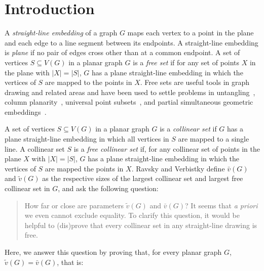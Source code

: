 

\section{Introduction}


A \emph{straight-line embedding} of a graph $G$ maps each vertex to a point in the plane and each edge to a line segment between its endpoints. A straight-line
embedding is \emph{plane} if no pair of edges cross other than at a
common endpoint. A set
of vertices  $S\subseteq V(G)$ in a planar graph $G$ is a \emph{free
  set} if for any set of points $X$ in the plane with $|X|=|S|$, $G$ has a plane
straight-line embedding in which the vertices of $S$ are mapped to the points in $X$.  Free sets are useful tools in graph drawing
and related areas and have been used to settle problems in untangling~\cite{bose.dujmovic.ea:polynomial,dalozzo.dujmovic.ea:drawing,dujmovic:utility,ravsky.verbitsky:on,ravsky.verbitsky:on-arxiv}, column planarity~\cite{dalozzo.dujmovic.ea:drawing,dujmovic:utility}, universal point subsets~\cite{dalozzo.dujmovic.ea:drawing,dujmovic:utility},
and partial simultaneous geometric embeddings~\cite{dujmovic:utility}.

 A set of vertices  $S\subseteq V(G)$ in a planar graph $G$ is a
 \emph{collinear set} if $G$ has a plane straight-line embedding in
 which all vertices in $S$ are mapped to a single line.  A collinear set $S$
is a \emph{free collinear set} if, for any collinear set of points in
the plane $X$ with $|X|=|S|$, $G$ has a plane straight-line embedding in
which the vertices of $S$ are mapped the points in $X$.  
Ravsky and Verbistky \cite{ravsky.verbitsky:on,ravsky.verbitsky:on-arxiv}
define $\bar{v}(G)$ and $\tilde{v}(G)$ as the respective sizes of the
largest collinear set and largest free collinear set in $G$, and ask
the following question:
\begin{quote}
	How far or close are parameters $\tilde{v}(G)$ and $\bar{v}(G)$? It
	seems that \emph{a priori} we even cannot exclude equality. To clarify
	this question, it would be helpful to (dis)prove that every collinear
	set in any straight-line drawing is free.
\end{quote}
%
Here, we answer this question by proving that, for every planar graph $G$,
$\tilde{v}(G)=\bar{v}(G)$, that is:

